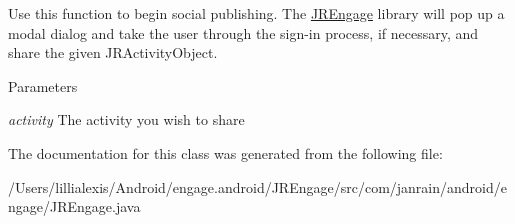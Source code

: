 Use this function to begin social publishing. The \hyperlink{classcom_1_1janrain_1_1android_1_1engage_1_1_j_r_engage}{JREngage} library will pop up a modal dialog and take the user through the sign-\/in process, if necessary, and share the given {\ttfamily JRActivityObject}.


\begin{DoxyParams}{Parameters}
\item[{\em activity}]The activity you wish to share \end{DoxyParams}


The documentation for this class was generated from the following file:\begin{DoxyCompactItemize}
\item 
/Users/lillialexis/Android/engage.android/JREngage/src/com/janrain/android/engage/JREngage.java\end{DoxyCompactItemize}
